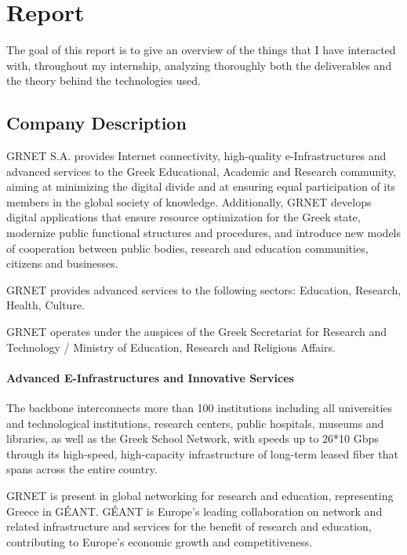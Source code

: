 
\chapter{Report}

The goal of this report is to give an overview of the things that I have interacted with, throughout my internship, analyzing thoroughly both the deliverables and the theory behind the technologies used.

\section{Company Description}
GRNET S.A. provides Internet connectivity,
high-quality e-Infrastructures and advanced services to the Greek Educational,
Academic and Research community,
aiming at minimizing the digital divide and
at ensuring equal participation of its members
in the global society of knowledge.
Additionally, GRNET develops digital applications that
ensure resource optimization for the Greek state,
modernize public functional structures and procedures,
and introduce new models of cooperation between public bodies,
research and education communities, citizens and businesses.

GRNET provides advanced services to the following sectors:
Education, Research, Health, Culture.

GRNET operates under the auspices of
the Greek Secretariat for Research and Technology /
Ministry of Education, Research and Religious Affairs.

\subsubsection{Advanced E-Infrastructures and Innovative Services}
The backbone interconnects more than 100 institutions including
all universities and technological institutions,
research centers, public hospitals, museums and libraries,
as well as the Greek School Network,
with speeds up to 26*10 Gbps through its high-speed,
high-capacity infrastructure of long-term leased fiber
that spans across the entire country.\par

GRNET is present in global networking for research and education,
representing Greece in GÉANT.
GÉANT is Europe’s leading collaboration on network
and related infrastructure and services
for the benefit of research and education,
contributing to Europe’s economic growth and competitiveness.

